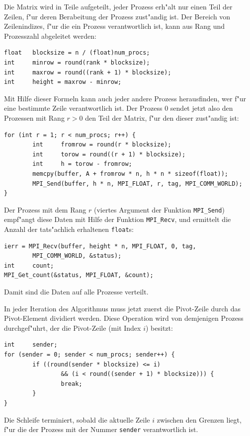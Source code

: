Die Matrix wird in Teile aufgeteilt, jeder Prozess erh"alt nur einen
Teil der Zeilen, f"ur deren Berabeitung der Prozess zust"andig ist. 
Der Bereich von Zeilenindizes, f"ur die ein Prozess verantwortlich ist,
kann aus Rang und Prozesszahl abgeleitet werden:
\begin{verbatim}
float   blocksize = n / (float)num_procs;
int     minrow = round(rank * blocksize);
int     maxrow = round((rank + 1) * blocksize);
int     height = maxrow - minrow;
\end{verbatim}
Mit Hilfe dieser Formeln kann auch jeder andere Prozess herausfinden,
wer f"ur eine bestimmte Zeile verantwortlich ist.
Der Prozess 0 sendet jetzt also den Prozessen mit Rang $r>0$ den Teil
der Matrix, f"ur den dieser zust"andig ist:
\begin{verbatim}
for (int r = 1; r < num_procs; r++) {
        int     fromrow = round(r * blocksize);
        int     torow = round((r + 1) * blocksize);
        int     h = torow - fromrow;
        memcpy(buffer, A + fromrow * n, h * n * sizeof(float));
        MPI_Send(buffer, h * n, MPI_FLOAT, r, tag, MPI_COMM_WORLD);
}
\end{verbatim}
Der Prozess mit dem Rang $r$ (viertes Argument der Funktion
\verb+MPI_Send+) empf"angt diese Daten mit Hilfe der Funktion
\verb+MPI_Recv+, und ermittelt die Anzahl der tats"achlich erhaltenen
\texttt{float}s:
\begin{verbatim}
ierr = MPI_Recv(buffer, height * n, MPI_FLOAT, 0, tag,
        MPI_COMM_WORLD, &status);
int     count;
MPI_Get_count(&status, MPI_FLOAT, &count);
\end{verbatim}
Damit sind die Daten auf alle Prozesse verteilt.

In jeder Iteration des Algorithmus muss jetzt zuerst die Pivot-Zeile
durch das Pivot-Element dividiert werden. Diese Operation wird von
demjenigen Prozess durchgef"uhrt, der die Pivot-Zeile (mit Index $i$) besitzt:
\begin{verbatim}
int     sender;
for (sender = 0; sender < num_procs; sender++) {
        if ((round(sender * blocksize) <= i)
                && (i < round((sender + 1) * blocksize))) {
                break;
        }
}
\end{verbatim}
Die Schleife terminiert, sobald die aktuelle Zeile $i$ zwischen
den Grenzen liegt, f"ur die der Prozess mit der Nummer \verb+sender+
verantwortlich ist.

